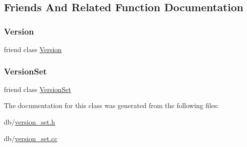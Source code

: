 \subsection{Friends And Related Function Documentation}
\mbox{\label{classleveldb_1_1_compaction_ace162f32d4abb584945d3a55a389b0a3}} 
\subsubsection{\texorpdfstring{Version}{Version}}
{\footnotesize\ttfamily friend class \mbox{\hyperlink{classleveldb_1_1_version}{Version}}\hspace{0.3cm}{\ttfamily [friend]}}

\mbox{\label{classleveldb_1_1_compaction_a1827cd1b4d6e9e3c378ce37ca3cce635}} 
\subsubsection{\texorpdfstring{VersionSet}{VersionSet}}
{\footnotesize\ttfamily friend class \mbox{\hyperlink{classleveldb_1_1_version_set}{Version\+Set}}\hspace{0.3cm}{\ttfamily [friend]}}



The documentation for this class was generated from the following files\+:\begin{DoxyCompactItemize}
\item 
db/\mbox{\hyperlink{version__set_8h}{version\+\_\+set.\+h}}\item 
db/\mbox{\hyperlink{version__set_8cc}{version\+\_\+set.\+cc}}\end{DoxyCompactItemize}
